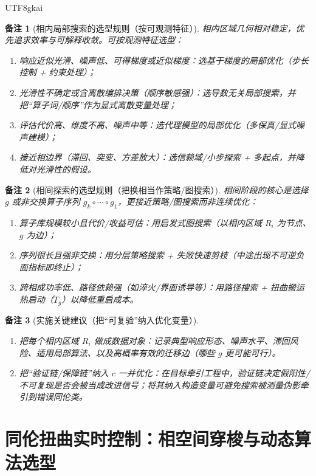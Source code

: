 \documentclass[12pt]{article}
\newtheorem{remark}{备注}[section]
\begin{document}
\begin{CJK*}{UTF8}{gkai}
\begin{remark}[相内局部搜索的选型规则（按可观测特征）]
相内区域几何相对稳定，优先追求效率与可解释收敛。可按观测特征选型：
\begin{enumerate}
  \item 响应近似光滑、噪声低、可得梯度或近似梯度：选基于梯度的局部优化（步长控制 + 约束处理）；
  \item 光滑性不确定或含离散编排决策（顺序敏感强）：选导数无关局部搜索，并把“算子词/顺序”作为显式离散变量处理；
  \item 评估代价高、维度不高、噪声中等：选代理模型的局部优化（多保真/显式噪声建模）；
  \item 接近相边界（滞回、突变、方差放大）：选信赖域/小步探索 + 多起点，并降低对光滑性的假设。
\end{enumerate}
\end{remark}

\begin{remark}[相间探索的选型规则（把换相当作策略/图搜索）]
相间阶段的核心是选择 $g$ 或非交换算子序列 $g_k\circ\cdots\circ g_1$，更接近策略/图搜索而非连续优化：
\begin{enumerate}
  \item 算子库规模较小且代价/收益可估：用启发式图搜索（以相内区域 $R_i$ 为节点、$g$ 为边）；
  \item 序列很长且强非交换：用分层策略搜索 + 失败快速剪枝（中途出现不可逆负面指标即终止）；
  \item 跨相成功率低、路径依赖强（如淬火/界面诱导等）：用路径搜索 + 扭曲搬运热启动（$T_g$）以降低重启成本。
\end{enumerate}
\end{remark}

\begin{remark}[实施关键建议（把“可复验”纳入优化变量）]
\begin{enumerate}
  \item 把每个相内区域 $R_i$ 做成数据对象：记录典型响应形态、噪声水平、滞回风险、适用局部算法、以及高概率有效的迁移边（哪些 $g$ 更可能可行）。
  \item 把“验证链/保障链”纳入 $c$ 一并优化：在目标牵引工程中，验证链决定假阳性/不可复现是否会被当成改进信号；将其纳入构造变量可避免搜索被测量伪影牵引到错误同伦类。
\end{enumerate}
\end{remark}

\section{同伦扭曲实时控制：相空间穿梭与动态算法选型}
\label{sec:twisted-homotopy-real-time-control}


\end{CJK*}
\end{document}
